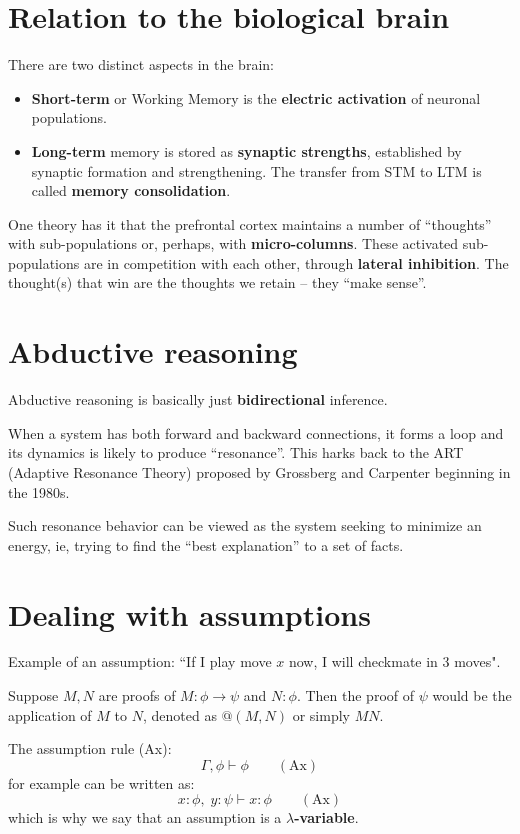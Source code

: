 \section{Relation to the biological brain}

There are two distinct aspects in the brain:
\begin{itemize}
	\item \textbf{Short-term} or Working Memory is the \textbf{electric activation} of neuronal populations.
	\item \textbf{Long-term} memory is stored as \textbf{synaptic strengths}, established by synaptic formation and strengthening.  The transfer from STM to LTM is called \textbf{memory consolidation}.
\end{itemize}

One theory has it that the prefrontal cortex maintains a number of ``thoughts'' with sub-populations or, perhaps, with \textbf{micro-columns}.  These activated sub-populations are in competition with each other, through \textbf{lateral inhibition}.  The thought(s) that win are the thoughts we retain -- they ``make sense''.

\section{Abductive reasoning}

Abductive reasoning is basically just \textbf{bidirectional} inference.

When a system has both forward and backward connections, it forms a loop and its dynamics is likely to produce ``resonance''.  This harks back to the ART (Adaptive Resonance Theory) proposed by Grossberg and Carpenter beginning in the 1980s.

Such resonance behavior can be viewed as the system seeking to minimize an energy, ie, trying to find the ``best explanation'' to a set of facts.  

\section{Dealing with assumptions}

Example of an assumption:  ``If I play move $x$ now, I will checkmate in 3 moves".

Suppose $M, N$ are proofs of $M: \phi \rightarrow \psi$ and $N: \phi$.  Then the proof of $\psi$ would be the application of $M$ to $N$, denoted as $@(M, N)$ or simply $M N$.

The assumption rule (Ax):
\begin{equation}
\Gamma, \phi \vdash \phi \qquad (\mbox{Ax})
\end{equation}
for example can be written as:
\begin{equation}
x : \phi, \; y : \psi \vdash x : \phi \qquad (\mbox{Ax})
\end{equation}
which is why we say that an assumption is a \textbf{$\lambda$-variable}.  

